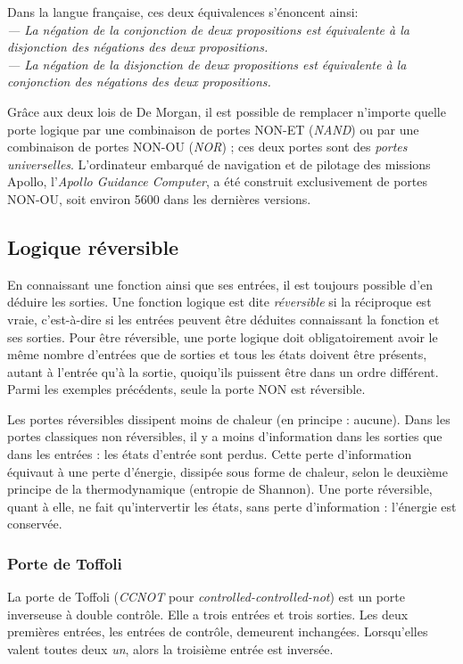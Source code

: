 \documentclass[canadien,12pt,oneside,letterpaper]{article}
\begin{document}
Dans la langue française, ces deux équivalences s'énoncent ainsi:\\
\emph{--- La négation de la conjonction de deux propositions est équivalente à la disjonction des négations des deux propositions.\\
--- La négation de la disjonction de deux propositions est équivalente à la conjonction des négations des deux propositions.}

Grâce aux deux lois de De Morgan, il est possible de remplacer n'importe quelle porte logique par une combinaison de portes NON-ET (\textit{NAND}) ou par une combinaison de portes NON-OU (\textit{NOR}) ; ces deux portes sont des \textit{portes universelles}. L'ordinateur embarqué de navigation et de pilotage des missions Apollo, l'\textit{Apollo Guidance Computer}, a été construit exclusivement de portes NON-OU, soit environ 5600 dans les dernières versions.


\subsection{Logique réversible}

En connaissant une fonction ainsi que ses entrées, il est toujours possible d'en déduire les sorties. Une fonction logique est dite \textit{réversible} si la réciproque est vraie, c'est-à-dire si les entrées peuvent être déduites connaissant la fonction et ses sorties. Pour être réversible, une porte logique doit obligatoirement avoir le même nombre d'entrées que de sorties et tous les états doivent être présents, autant à l'entrée qu'à la sortie, quoiqu'ils puissent être dans un ordre différent. Parmi les exemples précédents, seule la porte NON est réversible.

Les portes réversibles dissipent moins de chaleur (en principe : aucune). Dans les portes classiques non réversibles, il y a moins d'information dans les sorties que dans les entrées : les états d'entrée sont perdus. Cette perte d'information équivaut à une perte d'énergie, dissipée sous forme de chaleur, selon le deuxième principe de la thermodynamique (entropie de Shannon). Une porte réversible, quant à elle, ne fait qu'intervertir les états, sans perte d'information : l'énergie est conservée.


\subsubsection{Porte de Toffoli}

La porte de Toffoli (\textit{CCNOT} pour \textit{controlled-controlled-not}) est un porte inverseuse à double contrôle. Elle a trois entrées et trois sorties. Les deux premières entrées, les entrées de contrôle, demeurent inchangées. Lorsqu'elles valent toutes deux \textit{un}, alors la troisième entrée est inversée.
\end{document}

